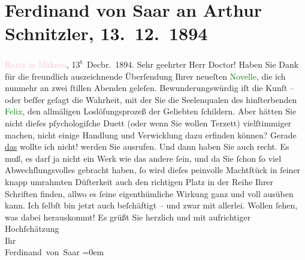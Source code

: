 

               \section[Ferdinand von Saar an Arthur Schnitzler, 13. 12. 1894]{ Ferdinand von Saar an Arthur Schnitzler,
                    13. 12. 1894}\nopagebreak{}\rehead{ }\normalsize\beginnumbering{} \toendnotes[C]{\smallbreak\pagebreak[2]} 
\toendnotes[C]{\smallbreak}\pstart
           \raggedleft{}{\pb}\textcolor{pink}{\textsc{Raitz} in Mähren}{}\ledrightnote{\textcolor{pink}{Rájec-Jestřebí}}, 13\textsuperscript{t} Decbr. 1894.\pend
           \pstart{}Sehr geehrter Herr Doctor!\pend\pstart
           Haben Sie Dank für die freundlich auszeichnende Überſendung Ihrer neueſten \textcolor{green}{Novelle}{}\ledrightnote{\textcolor{green}{Sterben. Novelle}}, die ich nunmehr an zwei ſtillen Abenden
                    geleſen. Bewunderungswürdig iſt die Kunſt – oder beſſer geſagt die Wahrheit, mit
                    der Sie die Seelenqualen des hinſterbenden \textcolor{green}{Felix}{}, den allmäligen Loslöſungsprozeß der Geliebten ſchildern.
                    Aber hätten Sie nicht dieſes pſychologiſche Duett (oder wenn Sie wollen Terzett)
                    vielſtimmiger machen, nicht einige Handlung und Verwicklung dazu erfinden
                    können? Gerade \uline{das} wollte ich nicht! werden Sie
                    ausrufen. Und dann haben Sie auch recht. Es muß, es darf ja nicht ein Werk wie
                    das {\pb}andere ſein, und da Sie ſchon ſo
                    viel Abwechſlungsvolles gebracht haben, ſo wird dieſes peinvolle Machtſtück in
                    ſeiner knapp umrahmten Düſterkeit \introOben{}auch\introOben{} den richtigen
                    Platz in der Reihe Ihrer Schriften finden, allwo es ſeine eigenthümliche Wirkung
                    ganz und voll ausüben kann.\pend
           \pstart
           Ich ſelbſt bin jetzt auch beſchäftigt – und zwar mit allerlei. Wollen ſehen, was
                    dabei herauskommt!\pend
           \pstart
           Es grüßt Sie herzlich und mit aufrichtiger
                        Hochſchätzung{\\[\baselineskip]}Ihr{\\[\baselineskip]}\spacefill\mbox{Ferdinand von Saar}\pend
           \leftskip=0em{}\endnumbering{}  
      